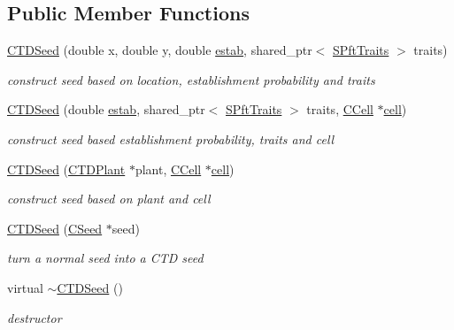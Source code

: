 \subsection*{Public Member Functions}
\begin{DoxyCompactItemize}
\item 
\mbox{\hyperlink{class_c_t_d_seed_ae61028e9e3f2dd60cb797a83d6ce760f}{C\+T\+D\+Seed}} (double x, double y, double \mbox{\hyperlink{class_c_seed_ae9b71bc4ff10218aade80211c89fedaf}{estab}}, shared\+\_\+ptr$<$ \mbox{\hyperlink{class_s_pft_traits}{S\+Pft\+Traits}} $>$ traits)
\begin{DoxyCompactList}\small\item\em construct seed based on location, establishment probability and traits \end{DoxyCompactList}\item 
\mbox{\hyperlink{class_c_t_d_seed_a8c1cfc19bd45961b268dbaf3a1441d92}{C\+T\+D\+Seed}} (double \mbox{\hyperlink{class_c_seed_ae9b71bc4ff10218aade80211c89fedaf}{estab}}, shared\+\_\+ptr$<$ \mbox{\hyperlink{class_s_pft_traits}{S\+Pft\+Traits}} $>$ traits, \mbox{\hyperlink{class_c_cell}{C\+Cell}} $\ast$\mbox{\hyperlink{class_c_seed_a93f258be6fe7841d52daa4e9e362c00e}{cell}})
\begin{DoxyCompactList}\small\item\em construct seed based establishment probability, traits and cell \end{DoxyCompactList}\item 
\mbox{\hyperlink{class_c_t_d_seed_a841c2982bb3efbeabf29250ed489c2bc}{C\+T\+D\+Seed}} (\mbox{\hyperlink{class_c_t_d_plant}{C\+T\+D\+Plant}} $\ast$plant, \mbox{\hyperlink{class_c_cell}{C\+Cell}} $\ast$\mbox{\hyperlink{class_c_seed_a93f258be6fe7841d52daa4e9e362c00e}{cell}})
\begin{DoxyCompactList}\small\item\em construct seed based on plant and cell \end{DoxyCompactList}\item 
\mbox{\hyperlink{class_c_t_d_seed_a39546c855452a998baab6661f0c9f49a}{C\+T\+D\+Seed}} (\mbox{\hyperlink{class_c_seed}{C\+Seed}} $\ast$seed)
\begin{DoxyCompactList}\small\item\em turn a normal seed into a C\+TD seed \end{DoxyCompactList}\item 
virtual \mbox{\hyperlink{class_c_t_d_seed_a31471ab40e10d17abf1c633f2db3159a}{$\sim$\+C\+T\+D\+Seed}} ()
\begin{DoxyCompactList}\small\item\em destructor \end{DoxyCompactList}\item 

\end{DoxyCompactItemize}
